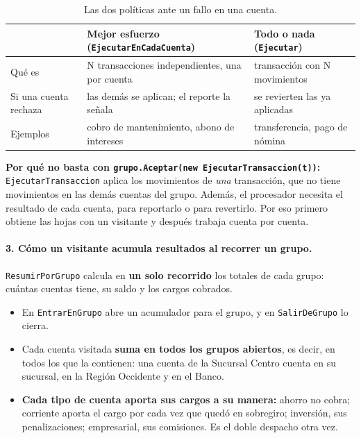 \begin{table}[H]
\centering
\small
\begin{tabularx}{\textwidth}{>{\raggedright\arraybackslash}p{2.6cm}
                             >{\raggedright\arraybackslash}X
                             >{\raggedright\arraybackslash}X}
\toprule
 & \textbf{Mejor esfuerzo (\texttt{EjecutarEnCadaCuenta})} & \textbf{Todo o nada
   (\texttt{Ejecutar})} \\
\midrule
Qué es & N transacciones independientes, una por cuenta & 1 transacción con N movimientos \\
\addlinespace
Si una cuenta rechaza & las demás se aplican; el reporte la señala & se revierten las ya
  aplicadas \\
\addlinespace
Ejemplos & cobro de mantenimiento, abono de intereses & transferencia, pago de nómina \\
\bottomrule
\end{tabularx}
\caption{Las dos políticas ante un fallo en una cuenta.}
\end{table}

\textbf{Por qué no basta con \texttt{grupo.Aceptar(\allowbreak{}new EjecutarTransaccion(t))}:}
\texttt{EjecutarTransaccion} aplica los movimientos de \emph{una} transacción, que no tiene
movimientos en las demás cuentas del grupo. Además, el procesador necesita el resultado de
cada cuenta, para reportarlo o para revertirlo. Por eso primero obtiene las hojas con un
visitante y después trabaja cuenta por cuenta.

\paragraph{3. Cómo un visitante acumula resultados al recorrer un grupo.}
\texttt{ResumirPorGrupo} calcula en \textbf{un solo recorrido} los totales de cada grupo:
cuántas cuentas tiene, su saldo y los cargos cobrados.
\begin{itemize}
  \item En \texttt{EntrarEnGrupo} abre un acumulador para el grupo, y en
        \texttt{SalirDeGrupo} lo cierra.
  \item Cada cuenta visitada \textbf{suma en todos los grupos abiertos}, es decir, en todos
        los que la contienen: una cuenta de la Sucursal Centro cuenta en su sucursal, en la
        Región Occidente y en el Banco.
  \item \textbf{Cada tipo de cuenta aporta sus cargos a su manera:} ahorro no cobra;
        corriente aporta el cargo por cada vez que quedó en sobregiro; inversión, sus
        penalizaciones; empresarial, sus comisiones. Es el doble despacho otra vez.
\end{itemize}

